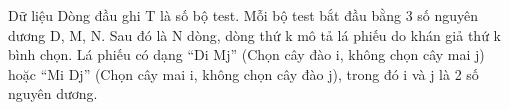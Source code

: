 Dữ liệu
Dòng đầu ghi T là số bộ test. Mỗi bộ test bắt đầu bằng 3 số nguyên dương D, M, N. Sau đó là N dòng, dòng thứ k mô tả lá phiếu do khán giả thứ k bình chọn. Lá phiếu có dạng “Di Mj” (Chọn cây đào i, không chọn cây mai j) hoặc “Mi Dj” (Chọn cây mai i, không chọn cây đào j), trong đó i và j là 2 số nguyên dương.